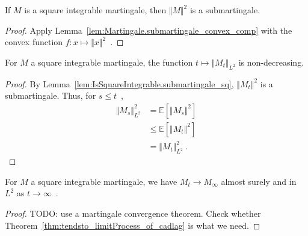 \begin{lemma}\label{lem:IsSquareIntegrable.submartingale_sq}
  \leanok
If $M$ is a square integrable martingale, then $\Vert M \Vert^2$ is a submartingale.
\end{lemma}

\begin{proof}
  \leanok
Apply Lemma~\ref{lem:Martingale.submartingale_convex_comp} with the convex function $f: x \mapsto \Vert x \Vert^2$~.
\end{proof}


\begin{lemma}\label{lem:IsSquareIntegrable.eLpNorm_two_mono}
  \leanok
For $M$ a square integrable martingale, the function $t \mapsto \Vert M_t \Vert_{L^2}$ is non-decreasing.
\end{lemma}

\begin{proof}
  \leanok
By Lemma~\ref{lem:IsSquareIntegrable.submartingale_sq}, $\Vert M_t \Vert^2$ is a submartingale.
Thus, for $s \le t$~,
\begin{align*}
  \Vert M_s \Vert_{L^2}^2
  &= \mathbb{E}[\Vert M_s \Vert^2]
  \\
  &\le \mathbb{E}[\Vert M_t \Vert^2]
  \\
  &= \Vert M_t \Vert_{L^2}^2
  \: .
\end{align*}
\end{proof}


\begin{lemma}\label{lem:IsSquareIntegrable.tendsto_limitProcess}
  \leanok
For $M$ a square integrable martingale, we have $M_t \to M_\infty$ almost surely and in $L^2$ as $t \to \infty$~.
\end{lemma}

\begin{proof}
TODO: use a martingale convergence theorem. Check whether Theorem~\ref{thm:tendsto_limitProcess_of_cadlag} is what we need.
\end{proof}


